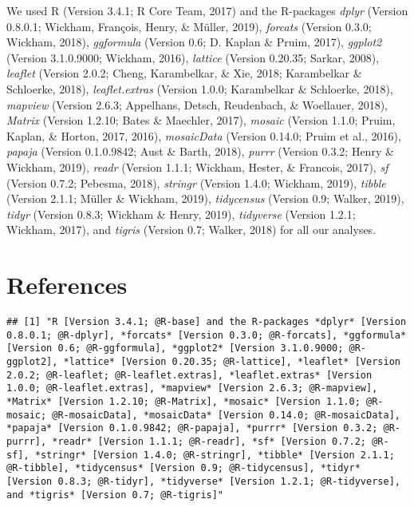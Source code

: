 \documentclass[man]{apa6}
\begin{document}
We used R (Version 3.4.1; R Core Team, 2017) and the R-packages
\emph{dplyr} (Version 0.8.0.1; Wickham, François, Henry, \& Müller,
2019), \emph{forcats} (Version 0.3.0; Wickham, 2018), \emph{ggformula}
(Version 0.6; D. Kaplan \& Pruim, 2017), \emph{ggplot2} (Version
3.1.0.9000; Wickham, 2016), \emph{lattice} (Version 0.20.35; Sarkar,
2008), \emph{leaflet} (Version 2.0.2; Cheng, Karambelkar, \& Xie, 2018;
Karambelkar \& Schloerke, 2018), \emph{leaflet.extras} (Version 1.0.0;
Karambelkar \& Schloerke, 2018), \emph{mapview} (Version 2.6.3;
Appelhans, Detsch, Reudenbach, \& Woellauer, 2018), \emph{Matrix}
(Version 1.2.10; Bates \& Maechler, 2017), \emph{mosaic} (Version 1.1.0;
Pruim, Kaplan, \& Horton, 2017, 2016), \emph{mosaicData} (Version
0.14.0; Pruim et al., 2016), \emph{papaja} (Version 0.1.0.9842; Aust \&
Barth, 2018), \emph{purrr} (Version 0.3.2; Henry \& Wickham, 2019),
\emph{readr} (Version 1.1.1; Wickham, Hester, \& Francois, 2017),
\emph{sf} (Version 0.7.2; Pebesma, 2018), \emph{stringr} (Version 1.4.0;
Wickham, 2019), \emph{tibble} (Version 2.1.1; Müller \& Wickham, 2019),
\emph{tidycensus} (Version 0.9; Walker, 2019), \emph{tidyr} (Version
0.8.3; Wickham \& Henry, 2019), \emph{tidyverse} (Version 1.2.1;
Wickham, 2017), and \emph{tigris} (Version 0.7; Walker, 2018) for all
our analyses.

\newpage

\section{References}\label{references}

\begin{verbatim}
## [1] "R [Version 3.4.1; @R-base] and the R-packages *dplyr* [Version 0.8.0.1; @R-dplyr], *forcats* [Version 0.3.0; @R-forcats], *ggformula* [Version 0.6; @R-ggformula], *ggplot2* [Version 3.1.0.9000; @R-ggplot2], *lattice* [Version 0.20.35; @R-lattice], *leaflet* [Version 2.0.2; @R-leaflet; @R-leaflet.extras], *leaflet.extras* [Version 1.0.0; @R-leaflet.extras], *mapview* [Version 2.6.3; @R-mapview], *Matrix* [Version 1.2.10; @R-Matrix], *mosaic* [Version 1.1.0; @R-mosaic; @R-mosaicData], *mosaicData* [Version 0.14.0; @R-mosaicData], *papaja* [Version 0.1.0.9842; @R-papaja], *purrr* [Version 0.3.2; @R-purrr], *readr* [Version 1.1.1; @R-readr], *sf* [Version 0.7.2; @R-sf], *stringr* [Version 1.4.0; @R-stringr], *tibble* [Version 2.1.1; @R-tibble], *tidycensus* [Version 0.9; @R-tidycensus], *tidyr* [Version 0.8.3; @R-tidyr], *tidyverse* [Version 1.2.1; @R-tidyverse], and *tigris* [Version 0.7; @R-tigris]"
\end{verbatim}
\end{document}
